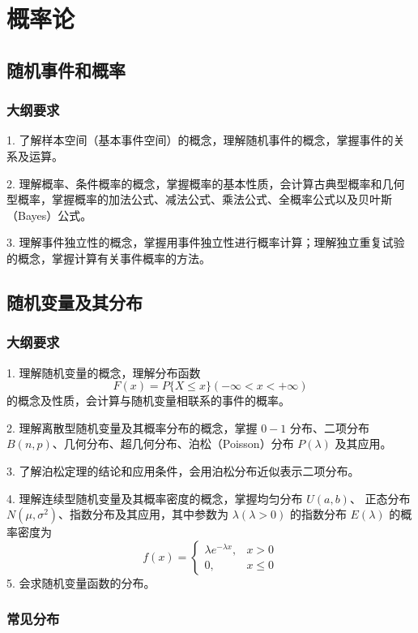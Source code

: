 \chapter{概率论}

\newcommand{\bbP}{\mathbb{P}}

\section{随机事件和概率}

\subsection{大纲要求}

1. 了解样本空间（基本事件空间）的概念，理解随机事件的概念，掌握事件的关系及运算。

2. 理解概率、条件概率的概念，掌握概率的基本性质，会计算古典型概率和几何型概率，掌握概率的加法公式、减法公式、乘法公式、全概率公式以及贝叶斯（Bayes）公式。

3. 理解事件独立性的概念，掌握用事件独立性进行概率计算；理解独立重复试验的概念，掌握计算有关事件概率的方法。


\section{随机变量及其分布}

\subsection{大纲要求}

1. 理解随机变量的概念，理解分布函数
$$
F(x) = P\{X \leqslant x\}(-\infty < x < +\infty)
$$
的概念及性质，会计算与随机变量相联系的事件的概率。

2. 理解离散型随机变量及其概率分布的概念，掌握 $0-1$ 分布、二项分布 $B(n, p)$、几何分布、超几何分布、泊松（Poisson）分布 $P(\lambda)$ 及其应用。

3. 了解泊松定理的结论和应用条件，会用泊松分布近似表示二项分布。

4. 理解连续型随机变量及其概率密度的概念，掌握均匀分布 $U(a, b)$、 正态分布 $N(\mu, \sigma^2)$、指数分布及其应用，其中参数为 $\lambda(\lambda > 0)$ 的指数分布 $E(\lambda)$ 的概率密度为
$$
f(x) = \begin{cases} \lambda e^{-\lambda x}, & x > 0 \\ 0, &x \leqslant 0 \end{cases}
$$
5. 会求随机变量函数的分布。

\subsection{常见分布}

